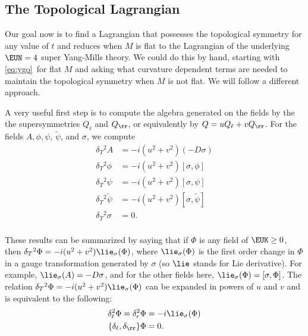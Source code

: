 
\subsection{The Topological Lagrangian}

\label{sec:toplag}

Our goal now is to find a Lagrangian that possesses the
topological symmetry for any value of $t$ and reduces when $M$ is
flat to the Lagrangian of the underlying ${\EUN}=4$ super
Yang-Mills theory.  We could do this by hand, starting with \eqref{eq:ygo}\
for flat $M$ and asking what curvature dependent terms are needed
to maintain the topological symmetry when $M$ is not flat.  We
will follow a different approach.

A very useful first step is to compute the algebra generated on
the fields by the the supersymmetries $Q_\ell$ and $Q_\rr$, or
equivalently by $Q=uQ_\ell+vQ_\rr$.  For the fields $
A,\phi,\psi$, $\tilde\psi$, and $\sigma$, we compute
\setcounter{equation}{34}
\begin{equation}\label{eq:ibo}
\begin{aligned}\delta_T{}^2 A & = -i(u^2+v^2)(-D\sigma)\\
\delta_T{}^2\phi & = -i(u^2+v^2)[\sigma,\phi]\\ \delta_T{}^2 \psi
& = -i(u^2+v^2)[\sigma,\psi]\\ \delta_T{}^2\tilde\psi& =
-i(u^2+v^2)[\sigma,\tilde\psi]\\ \delta_T{}^2\sigma& = 0.\\\end{aligned}
\end{equation}

These results can be summarized by saying that if $\Phi$ is any
field of $\EUK\geq 0$, then
$\delta_T{}^2\Phi=-i(u^2+v^2){{\lie}}_\sigma(\Phi)$, where
${{\lie}}_\sigma(\Phi)$ is the first order change in $\Phi$ in a
gauge transformation generated by $\sigma$ (so $\lie$ stands for
Lie derivative). For example, ${{\lie}}_\sigma(A)=-D\sigma$, and
for the other fields here, ${{\lie}}_\sigma(\Phi)=[\sigma,\Phi]$.
The relation $\delta_T{}^2\Phi=-i(u^2+v^2){{\lie}}_\sigma(\Phi)$
can be expanded in powers of $u$ and $v$ and is equivalent to the
following:
\setcounter{equation}{35}
\begin{equation}\label{eq:uvu}
\begin{aligned}\delta_\ell^2\Phi=\delta_r^2\Phi&=-i{{\lie}}_\sigma(\Phi)\\
\{\delta_\ell,\delta_\rr\}\Phi& = 0.\\\end{aligned}
\end{equation}

